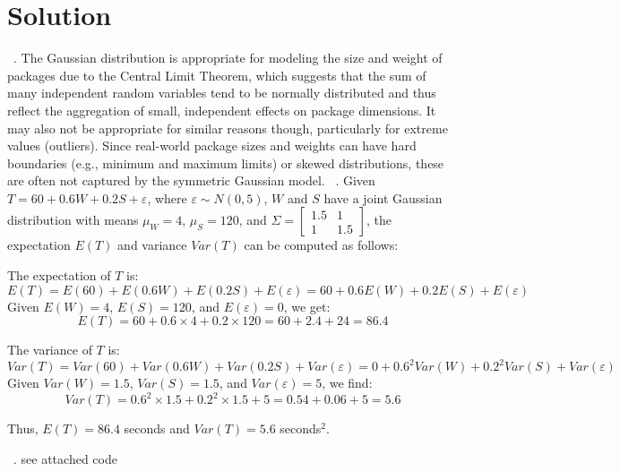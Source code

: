 \documentclass{harvardml}
\theoremstyle{definition}
\theoremstyle{plain}
\newenvironment{solution}
  {\color{blue}\section*{Solution}}
{}
\begin{document}
\begin{solution}
        \ . The Gaussian distribution is appropriate for modeling the size and weight of packages due to the Central Limit Theorem, which suggests that the sum of many independent random variables tend to be normally distributed and thus reflect the aggregation of small, independent effects on package dimensions. It may also not be appropriate for similar reasons though, particularly for extreme values (outliers). Since real-world package sizes and weights can have hard boundaries (e.g., minimum and maximum limits) or skewed distributions, these are often not captured by the symmetric Gaussian model.
        \ . Given \(T = 60 + 0.6W + 0.2S + \varepsilon\), where \(\varepsilon \sim N(0,5)\), \(W\) and \(S\) have a joint Gaussian distribution with means \(\mu_W = 4\), \(\mu_S = 120\), and \(\Sigma = \left[ \begin{array}{cc} 1.5 & 1 \\ 1 & 1.5 \end{array} \right]\), the expectation \(E(T)\) and variance \(Var(T)\) can be computed as follows:

The expectation of \(T\) is:
\[
E(T) = E(60) + E(0.6W) + E(0.2S) + E(\varepsilon) = 60 + 0.6E(W) + 0.2E(S) + E(\varepsilon)
\]
Given \(E(W) = 4\), \(E(S) = 120\), and \(E(\varepsilon) = 0\), we get:
\[
E(T) = 60 + 0.6 \times 4 + 0.2 \times 120 = 60 + 2.4 + 24 = 86.4
\]

The variance of \(T\) is:
\[
Var(T) = Var(60) + Var(0.6W) + Var(0.2S) + Var(\varepsilon) = 0 + 0.6^2Var(W) + 0.2^2Var(S) + Var(\varepsilon)
\]
Given \(Var(W) = 1.5\), \(Var(S) = 1.5\), and \(Var(\varepsilon) = 5\), we find:
\[
Var(T) = 0.6^2 \times 1.5 + 0.2^2 \times 1.5 + 5 = 0.54 + 0.06 + 5 = 5.6
\]

Thus, \(E(T) = 86.4\) seconds and \(Var(T) = 5.6\) seconds\(^2\).

\ . see attached code 



\end{solution} 
\end{document}

